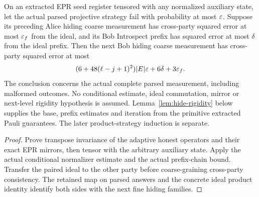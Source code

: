 \begin{lemma}
\label{lem:intro-actual-hiding-rigidity-step}
\leanok
On an extracted EPR seed register tensored with any normalized auxiliary
state, let the actual parsed projective strategy fail with probability at
most $\varepsilon$. Suppose its preceding Alice hiding coarse measurement has
cross-party squared error at most $\varepsilon_f$ from the ideal, and its Bob
Introspect prefix has squared error at most $\delta$ from the ideal prefix.
Then the next Bob hiding coarse measurement has cross-party squared error
at most
\[
 (6+48(\ell-j+1)^2)|E|\varepsilon+6\delta+3\varepsilon_f.
\]
The conclusion concerns the actual complete parsed measurement, including
malformed outcomes. No conditional estimate, ideal commutation, mirror or
next-level rigidity hypothesis is assumed. Lemma~\ref{lem:hide-rigidity}
below supplies the base, prefix estimates and iteration from the primitive
extracted Pauli guarantees. The later product-strategy induction is separate.
\end{lemma}
\begin{proof}
\leanok
Prove transpose invariance of the adaptive honest operators and their exact
EPR mirrors, then tensor with the arbitrary auxiliary state. Apply the actual
conditional normalizer estimate and the actual prefix-chain bound. Transfer
the paired ideal to the other party before coarse-graining cross-party
consistency. The retained map on parsed answers and the concrete ideal
product identity identify both sides with the next fine hiding families.
\end{proof}

